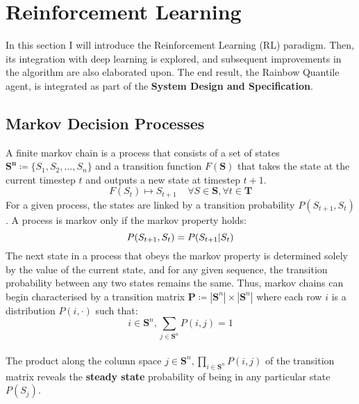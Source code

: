 \section{Reinforcement Learning}
In this section I will introduce the Reinforcement Learning (RL)
paradigm. Then, its integration with deep learning is explored, and
subsequent improvements in the algorithm are also elaborated upon.
The end result, the Rainbow Quantile agent, is integrated as part of the \textbf{System Design and Specification}.
\subsection{Markov Decision Processes}
A finite markov chain is a process that consists of a set of states
$\mathbf{S^n} \coloneqq \{S_1, S_2, \hdots, S_n\}$ and a transition
function $F(\mathbf{S})$ that takes the state at the current
timestep $t$ and outputs a new state at timestep $t+1$.
\begin{equation}
    F(S_t) \mapsto S_{t+1} \;\;\;\; \forall S \in \mathbf{S}, \forall t\in \mathbf{T}
\end{equation}
For a given process, the states are linked by a transition probability
$P(S_{t+1}, S_t)$. A process is markov only if the markov property holds:
\begin{equation}
    P(S_{t+1}, S_t) = P(S_{t+1} | S_t) \\
\end{equation}
The next state in a process that obeys the markov property is determined
solely by the value of the current state, and for any given sequence, the transition
probability between any two states remains the same. Thus, markov chains can begin
characterised by a transition matrix $\mathbf{P} \coloneqq |\mathbf{S}^n| \times |\mathbf{S}^n|$
where each row $i$ is a distribution $P(i, \cdot)$ such that:
\begin{equation}
    i \in \mathbf{S}^n, \sum_{j \in \mathbf{S}^n} P(i,j) = 1
\end{equation}\\
The product along the column space $j \in \mathbf{S}^n,{\displaystyle \prod_{i \in \mathbf{S}^n}} P(i,j)$ of the transition matrix reveals
the \textbf{steady state} probability of being in any particular state $P(S_j)$.
